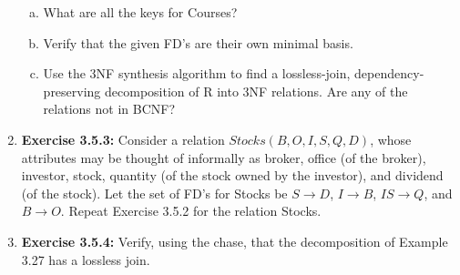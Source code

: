 \documentclass[12pt]{article}
\begin{document}
\begin{enumerate}[1.]
    \begin{enumerate}[a)]
        \item What are all the keys for Courses?
        \item Verify that the given FD's are their own minimal basis.
        \item Use the 3NF synthesis algorithm to find a lossless-join, dependency-preserving decomposition of R into 3NF relations. Are any of the relations not in BCNF?
    \end{enumerate}

    \item \textbf{Exercise 3.5.3:} Consider a relation $Stocks(B, O, I, S, Q, D)$, whose attributes
    may be thought of informally as broker, office (of the broker), investor, stock,
    quantity (of the stock owned by the investor), and dividend (of the stock). Let
    the set of FD's for Stocks be $S \to D$, $I \to B$, $IS \to Q$, and $B \to O$. Repeat
    Exercise 3.5.2 for the relation Stocks.

    \item \textbf{Exercise 3.5.4:} Verify, using the chase, that the decomposition of Example
    3.27 has a lossless join.

\end{enumerate}
\end{document}
